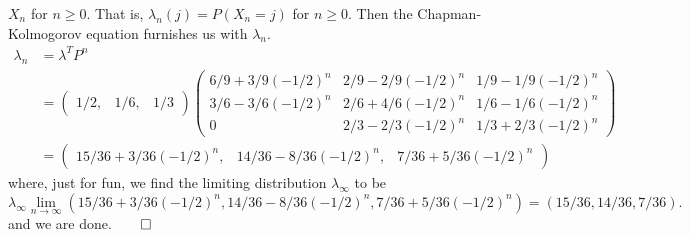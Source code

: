 \documentclass[11pt, letterpaper]{article}
\begin{document}
$X_n$ for $n\geq 0$. That is, $\lambda_n(j)=P(X_n=j)$ for $n\geq 0$. Then the Chapman-Kolmogorov equation furnishes us with $\lambda_n$.
\begin{align*}
    \lambda_n&=\lambda^T P^n\\
    &=\begin{pmatrix}
        1/2, & 1/6, & 1/3
    \end{pmatrix}\begin{pmatrix}
        6/9+3/9(-1/2)^n & 2/9 -2/9(-1/2)^n & 1/9 - 1/9(-1/2)^n\\
        3/6 - 3/6(-1/2)^n & 2/6+4/6(-1/2)^n & 1/6 - 1/6(-1/2)^n\\
        0 & 2/3 - 2/3(-1/2)^n & 1/3 + 2/3(-1/2)^n
    \end{pmatrix}\\
    &=\begin{pmatrix}
        15/36+3/36(-1/2)^n, & 14/36 - 8/36(-1/2)^n, & 7/36 + 5/36(-1/2)^n
    \end{pmatrix}
\end{align*}
where, just for fun, we find the limiting distribution $\lambda_\infty$ to be
\[\lambda_\infty\lim_{n\rightarrow\infty}(15/36+3/36(-1/2)^n, 14/36 - 8/36(-1/2)^n, 7/36 + 5/36(-1/2)^n)=(15/36,14/36,7/36).\]
and we are done.\hfill{$\qed$}
\end{document}
